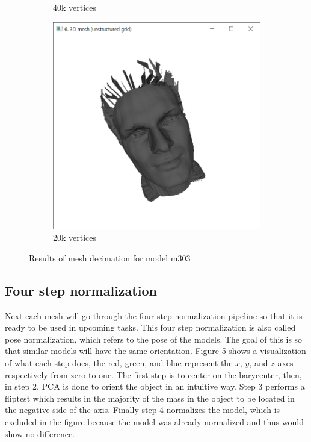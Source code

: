 \documentclass{bigdata}
\begin{document}
\begin{figure}[h!]
\begin{subfigure}[b]{0.3\linewidth}
    \caption{40k vertices}
  \end{subfigure}
  \begin{subfigure}[b]{0.3\linewidth}
    \includegraphics[width=\linewidth]{Pictures/postSub2.png}
    \caption{20k vertices}
  \end{subfigure}
  \caption{Results of mesh decimation for model m303}
  \label{fig:decimatedMesh}
\end{figure}

\subsection{Four step normalization}

Next each mesh will go through the four step normalization pipeline so that it is ready to be used in upcoming tasks. This four step normalization is also called pose normalization, which refers to the pose of the models. The goal of this is so that similar models will have the same orientation. Figure 5 shows a visualization of what each step does, the red, green, and blue represent the $x$, $y$, and $z$ axes respectively from zero to one. The first step is to center on the barycenter, then, in step 2, PCA is done to orient the object in an intuitive way. Step 3 performs a fliptest which results in the majority of the mass in the object to be located in the negative side of the axis. Finally step 4 normalizes the model, which is excluded in the figure because the model was already normalized and thus would show no difference.
\end{document}
